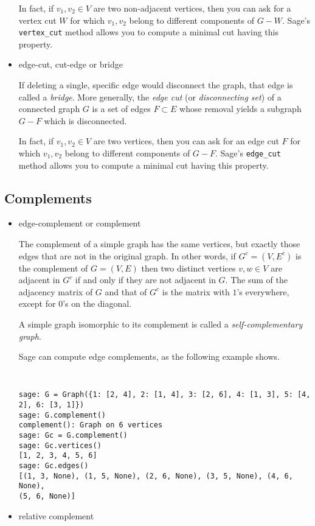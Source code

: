 \begin{itemize}
In fact, if $v_1,v_2\in V$ are two non-adjacent vertices,
then you can ask for a vertex cut $W$ for which
$v_1,v_2$ belong to different components of $G-W$.
Sage's {\tt vertex\_cut} method allows you to compute a 
minimal cut having this property.


\item edge-cut, cut-edge or bridge

If deleting a single, specific edge would
disconnect the graph, that edge is called a {\it bridge}. More generally,
the {\it edge cut} (or {\it disconnecting set}) of
a connected graph $G$ is a set of edges $F\subset E$ whose removal
yields a subgraph $G-F$ which is disconnected. 

In fact, if $v_1,v_2\in V$ are two vertices,
then you can ask for an edge cut $F$ for which
$v_1,v_2$ belong to different components of $G-F$.
Sage's {\tt edge\_cut} method allows you to compute a 
minimal cut having this property.
\end{itemize}



\subsection{Complements}

\begin{itemize}
\item edge-complement or complement

The complement of a simple graph has the same vertices, but exactly those
edges that are not in the original graph. 
In other words, if $G^c=(V,E^c)$ is the complement of $G=(V,E)$ then 
two distinct vertices $v,w\in V$ are adjacent in $G^c$ if and only if they are
not adjacent in $G$. The sum of the 
adjacency matrix of $G$ and that of $G^c$ is the matrix
with $1$'s everywhere, except for $0$'s on the diagonal.

A simple graph isomorphic to its complement is called a 
{\it self-complementary graph}.

Sage can compute edge complements, as the following example shows.

%
\begin{center}
\fontsize{9pt}{9pt}
\selectfont
\tt
\begin{lstlisting}
sage: G = Graph({1: [2, 4], 2: [1, 4], 3: [2, 6], 4: [1, 3], 5: [4, 2], 6: [3, 1]})
sage: G.complement()
complement(): Graph on 6 vertices
sage: Gc = G.complement()
sage: Gc.vertices()
[1, 2, 3, 4, 5, 6]
sage: Gc.edges()
[(1, 3, None), (1, 5, None), (2, 6, None), (3, 5, None), (4, 6, None),
(5, 6, None)]
\end{lstlisting}
\end{center}
%

\item relative complement
\end{itemize}

